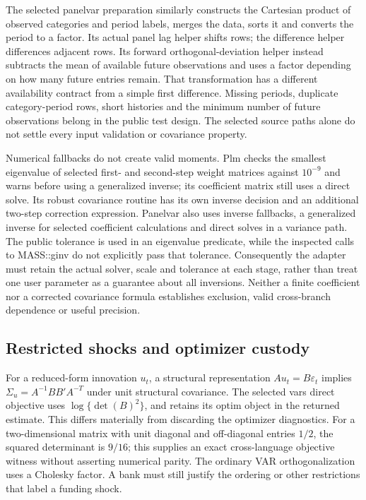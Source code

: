 The selected panelvar preparation similarly constructs the Cartesian product of observed categories and period labels, merges the data, sorts it and converts the period to a factor. Its actual panel lag helper shifts rows; the difference helper differences adjacent rows. Its forward orthogonal-deviation helper instead subtracts the mean of available future observations and uses a factor depending on how many future entries remain. That transformation has a different availability contract from a simple first difference. Missing periods, duplicate category-period rows, short histories and the minimum number of future observations belong in the public test design. The selected source paths alone do not settle every input validation or covariance property.~\citep{exec25_rdyn_panelvar}

Numerical fallbacks do not create valid moments. Plm checks the smallest eigenvalue of selected first- and second-step weight matrices against $10^{-9}$ and warns before using a generalized inverse; its coefficient matrix still uses a direct solve. Its robust covariance routine has its own inverse decision and an additional two-step correction expression. Panelvar also uses inverse fallbacks, a generalized inverse for selected coefficient calculations and direct solves in a variance path. The public tolerance is used in an eigenvalue predicate, while the inspected calls to MASS::ginv do not explicitly pass that tolerance. Consequently the adapter must retain the actual solver, scale and tolerance at each stage, rather than treat one user parameter as a guarantee about all inversions. Neither a finite coefficient nor a corrected covariance formula establishes exclusion, valid cross-branch dependence or useful precision.~\citep{exec25_rdyn_plm,exec25_rdyn_panelvar}

\subsection{Restricted shocks and optimizer custody}

For a reduced-form innovation $u_t$, a structural representation $Au_t=B\varepsilon_t$ implies $\Sigma_u=A^{-1}BB'A^{-T}$ under unit structural covariance. The selected vars direct objective uses $\log\{\det(B)^2\}$, and retains its optim object in the returned estimate. This differs materially from discarding the optimizer diagnostics. For a two-dimensional matrix with unit diagonal and off-diagonal entries $1/2$, the squared determinant is $9/16$; this supplies an exact cross-language objective witness without asserting numerical parity. The ordinary VAR orthogonalization uses a Cholesky factor. A bank must still justify the ordering or other restrictions that label a funding shock.~\citep{exec25_rdyn_vars,exec25_rdyn_choice}

